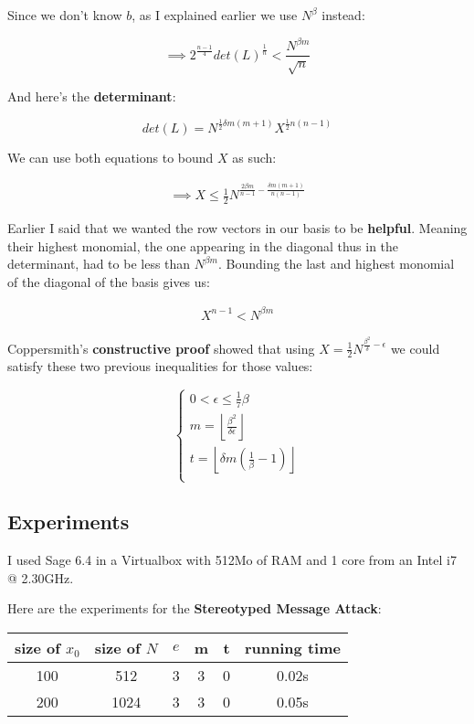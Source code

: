 \documentclass[a4paper,11pt]{article}
\begin{document}
Since we don't know $b$, as I explained earlier we use $N^\beta$ instead:

\[ \implies 2^{\frac{n-1}{4}}det(L)^{\frac{1}{n}} < \frac{N^{\beta m}}{\sqrt{n}} \]

And here's the \textbf{determinant}:

\[ det(L) = N^{\frac{1}{2}\delta m (m+1)}X^{\frac{1}{2}n(n-1)} \]

We can use both equations to bound $X$ as such:


\setcounter{equation}{0}
\begin{eqnarray}
\implies X \leq \frac{1}{2} N^{\frac{2\beta m}{n-1} - \frac{\delta m ( m + 1)}{n(n-1)}}
\end{eqnarray} 

Earlier I said that we wanted the row vectors in our basis to be \textbf{helpful}. Meaning their highest monomial, the one appearing in the diagonal thus in the determinant, had to be less than $N^{\beta m}$. Bounding the last and highest monomial of the diagonal of the basis gives us:

\begin{eqnarray}
 X^{n-1} < N^{\beta m}
\end{eqnarray}

Coppersmith's \textbf{constructive proof} showed that using $X = \frac{1}{2} N^{\frac{\beta^2}{\delta}-\epsilon}$ we could satisfy these two previous inequalities for those values:

\[ \begin{cases}
	0 < \epsilon \leq \frac{1}{7} \beta\\
	m = \left\lfloor \frac{\beta^2}{\delta \epsilon}\right\rfloor\\
	t = \left\lfloor \delta m (\frac{1}{\beta}-1)\right\rfloor\\
\end{cases} \]

\subsection{Experiments}\label{coppersmith-experiments}

I used Sage 6.4 in a Virtualbox with 512Mo of RAM and 1 core from an Intel i7 @ 2.30GHz.

Here are the experiments for the \textbf{Stereotyped Message Attack}:

\begin{center} 
\begin{tabular}{@{} *6c @{}}
\toprule
 size of $x_0$ & size of $N$ & $e$ & m & t & running time \\ 
\midrule
 100 & 512 & 3 & 3 & 0 & 0.02s\\ 
 200 & 1024 & 3 & 3 & 0 & 0.05s\\
\bottomrule
\end{tabular}
\end{center} 
\end{document}
